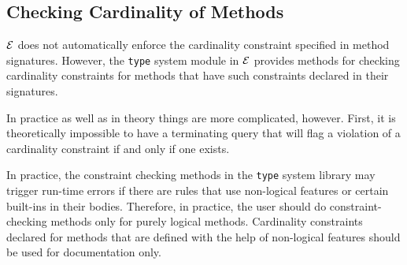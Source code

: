 \documentclass[11pt]{article}
\newcommand{\ERGO}{\mbox{\ensuremath{\cal{E}}\smaller{{\sc{RGO}}}}\xspace}
\newcommand{\FLSYSTEM}{\ERGO}
\begin{document}
\subsection{Checking Cardinality of Methods}\label{sec-cardinality}

\FLSYSTEM does not automatically enforce the cardinality constraint specified
in method signatures.  However, the {\tt type} system module in \FLSYSTEM
provides methods for checking cardinality
constraints for methods that have such constraints declared in their
signatures.

In practice as well as in theory things are more complicated, however.
First, it is theoretically impossible to have a terminating
query that will flag a
violation of a cardinality constraint if and only if one exists.

In practice, the constraint checking methods
in the {\tt type} system library may trigger run-time
errors if there are rules that use non-logical features or certain
built-ins
in their bodies.  Therefore, in practice, the user should do
constraint-checking methods only for purely logical methods. Cardinality
constraints declared for methods that are defined with the help of
non-logical features should be used for documentation only.
\end{document}
